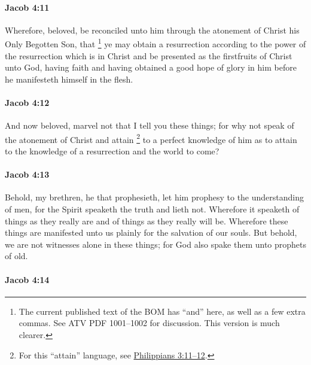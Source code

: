 		\paragraph{Jacob 4:11} %
			\label{JACOB-4-11}

			Wherefore, beloved, be reconciled unto him
			through the atonement of Christ his Only Begotten Son,
			that%
				\footnote{%
					The current published text of the BOM has ``and'' here, as well as a few extra commas. See ATV PDF 1001--1002 for discussion. This version is much clearer.
					}
			ye may obtain a resurrection
			according to the power of the resurrection which is in Christ
			and be presented as the firstfruits of Christ unto God,
			having faith and having obtained a good hope of glory in him
			before he manifesteth himself in the flesh.

		\paragraph{Jacob 4:12} %
			\label{JACOB-4-12}

			And now beloved, marvel not that I tell you these things;
			for why not speak of the atonement of Christ
			and attain%
				\footnote{%
					For this ``attain'' language, see \hyperref[PHILIPPIANS-3-11]{Philippians 3:11--12}.
					}
			to a perfect knowledge of him
			as to attain to the knowledge of a resurrection and the world to come?

		\paragraph{Jacob 4:13} %
			\label{JACOB-4-13}

			Behold, my brethren, he that prophesieth,
			let him prophesy to the understanding of men,
			for the Spirit speaketh the truth and lieth not.
			Wherefore it speaketh of things as they really are
			and of things as they really will be.
			Wherefore these things are manifested unto us plainly
			for the salvation of our souls.
			But behold, we are not witnesses alone in these things;
			for God also spake them unto prophets of old.

		\paragraph{Jacob 4:14} %
			\label{JACOB-4-14}


